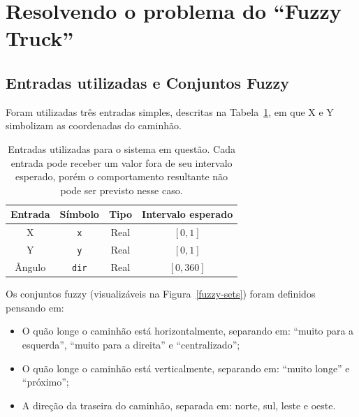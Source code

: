 \documentclass[twocolumn]{article}
\begin{document}
    \section{Resolvendo o problema do ``Fuzzy Truck''}

    \subsection{Entradas utilizadas e Conjuntos Fuzzy}

    Foram utilizadas três entradas simples, descritas na
    Tabela~\ref{system-entries}, em que X e Y simbolizam as coordenadas do
    caminhão.

    \begin{table}[ht]
        \centering{}
        \begin{tabular}{c c c c}
            \toprule
            Entrada & Símbolo & Tipo & Intervalo esperado \\
            \midrule
            X      & \texttt{x}   & Real & $[0, 1]$ \\
            Y      & \texttt{y}   & Real & $[0, 1]$ \\
            Ângulo & \texttt{dir} & Real & $[0, 360]$ \\
            \bottomrule
        \end{tabular}
        \caption{%
            Entradas utilizadas para o sistema em questão. Cada entrada pode
            receber um valor fora de seu intervalo esperado, porém o
            comportamento resultante não pode ser previsto nesse
            caso.\label{system-entries}
        }
    \end{table}

    Os conjuntos fuzzy (visualizáveis na Figura~\ref{fuzzy-sets}) foram
    definidos pensando em:

    \begin{itemize}
        \item O quão longe o caminhão está horizontalmente, separando em:
            ``muito para a esquerda'', ``muito para a direita'' e
            ``centralizado'';
        \item O quão longe o caminhão está verticalmente, separando em: ``muito
            longe'' e ``próximo'';
        \item A direção da traseira do caminhão, separada em: norte, sul, leste
            e oeste.
    \end{itemize}
\end{document}
